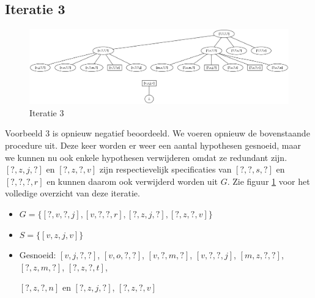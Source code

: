 \documentclass[alternative-exam.tex]{subfiles}
\begin{document}
\subsection{Iteratie 3}
\begin{figure}
\centering
\caption{Iteratie 3}
\label{iter_3}
\includegraphics[scale=0.35]{resources/graphs/iteration_3.png}
\end{figure}
Voorbeeld $3$ is opnieuw negatief beoordeeld. We voeren opnieuw de bovenstaande procedure uit. Deze keer worden er weer een aantal hypothesen gesnoeid, maar we kunnen nu ook enkele hypothesen verwijderen omdat ze redundant zijn. $[?,z,j,?]$ en $[?,z,?,v]$ zijn respectievelijk specificaties van $[?,?,s,?]$ en $[?,?,?,r]$ en kunnen daarom ook verwijderd worden uit $G$. Zie figuur \ref{iter_3} voor het volledige overzicht van deze iteratie.
\begin{itemize}
\item $G = \{[?,v,?,j],[v,?,?,r],[?,z,j,?],[?,z,?,v]\}$
\item $S = \{[v,z,j,v]\}$
\item Gesnoeid: $[v,j,?,?]$, $[v,o,?,?]$, $[v,?,m,?]$, $[v,?,?,j]$, $[m,z,?,?]$, $[?,z,m,?]$, $[?,z,?,t]$,

$[?,z,?,n]$ en $[?,z,j,?]$, $[?,z,?,v]$
\end{itemize}
\end{document}
